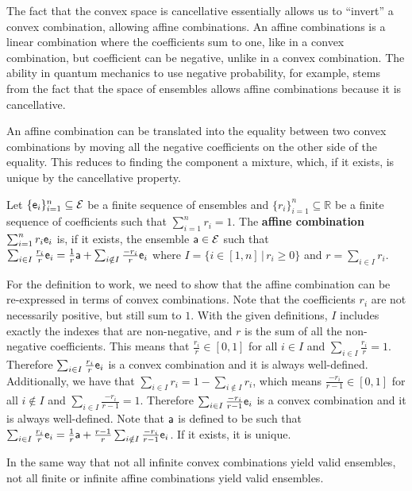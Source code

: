 The fact that the convex space is cancellative essentially allows us to ``invert'' a convex combination, allowing affine combinations. An affine combinations is a linear combination where the coefficients sum to one, like in a convex combination, but coefficient can be negative, unlike in a convex combination. The ability in quantum mechanics to use negative probability, for example, stems from the fact that the space of ensembles allows affine combinations because it is cancellative.

An affine combination can be translated into the equality between two convex combinations by moving all the negative coefficients on the other side of the equality. This reduces to finding the component a mixture, which, if it exists, is unique by the cancellative property.

\begin{mathSection}	
\begin{defn}
	Let $\{\ens_i\}_{i=1}^n \subseteq \Ens$ be a finite sequence of ensembles and $\{r_i\}_{i=1}^n \subseteq \mathbb{R}$ be a finite sequence of coefficients such that $\sum_{i=1}^n r_i = 1$. The \textbf{affine combination} $\sum_{i=1}^n r_i \ens_i$ is, if it exists, the ensemble $\ens[a] \in \Ens$ such that  $\sum_{i \in I} \frac{r_i}{r} \ens_i = \frac{1}{r} \ens[a] + \sum_{i \notin I} \frac{-r_i}{r} \ens_i$ where $I = \{ i \in [1,n] \, | \, r_i \geq 0 \}$ and $r = \sum_{i \in I} r_i$.
\end{defn}

\begin{check}
	For the definition to work, we need to show that the affine combination can be re-expressed in terms of convex combinations. Note that the coefficients $r_i$ are not necessarily positive, but still sum to $1$. With the given definitions, $I$ includes exactly the indexes that are non-negative, and $r$ is the sum of all the non-negative coefficients. This means that $\frac{r_i}{r} \in [0,1]$ for all $i \in I$ and $\sum_{i \in I} \frac{r_i}{r}=1$. Therefore $\sum_{i \in I} \frac{r_i}{r} \ens_i$ is a convex combination and it is always well-defined. Additionally, we have that $\sum_{i \in I} r_i = 1 - \sum_{i \notin I} r_i$, which means $\frac{-r_i}{r - 1} \in [0,1]$ for all $i \notin I$ and $\sum_{i \in I} \frac{-r_i}{r-1}=1$. Therefore $\sum_{i \in I} \frac{-r_i}{r-1} \ens_i$ is a convex combination and it is always well-defined. Note that $\ens[a]$ is defined to be such that $\sum_{i \in I} \frac{r_i}{r} \ens_i = \frac{1}{r} \ens[a] + \frac{r-1}{r}\sum_{i \notin I} \frac{-r_i}{r-1} \ens_i$. If it exists, it is unique.
\end{check}	

\begin{remark}
	In the same way that not all infinite convex combinations yield valid ensembles, not all finite or infinite affine combinations yield valid ensembles.
\end{remark}
\end{mathSection}


